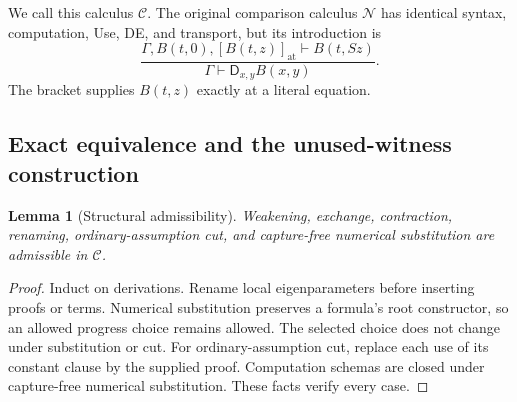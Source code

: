 \documentclass[11pt]{article}
\newtheorem{lemma}[theorem]{Lemma}
\theoremstyle{definition}
\begin{document}
We call this calculus $\mathcal C$. The original comparison
calculus $\mathcal N$ has identical syntax, computation,
Use, DE, and transport, but its introduction is
\[
\frac{\Gamma,B(t,0),[B(t,z)]_{\mathrm{at}}\vdash B(t,Sz)}
     {\Gamma\vdash\mathsf D_{x,y}B(x,y)}.
\tag{Old DI}\label{eq:choice-old-di}
\]
The bracket supplies $B(t,z)$ exactly at a literal equation.

\subsection{Exact equivalence and the unused-witness construction}

\begin{lemma}[Structural admissibility]
\label{lem:choice-structural}
Weakening, exchange, contraction, renaming, ordinary-assumption cut,
and capture-free numerical substitution are admissible in $\mathcal C$.
\end{lemma}
\begin{proof}
Induct on derivations. Rename local eigenparameters before inserting
proofs or terms. Numerical substitution preserves a formula's root
constructor, so an allowed progress choice remains allowed.
The selected choice does not change under substitution or cut.
For ordinary-assumption cut, replace each use of its constant clause
by the supplied proof. Computation schemas are closed under
capture-free numerical substitution. These facts verify every case.
\end{proof}
\end{document}
